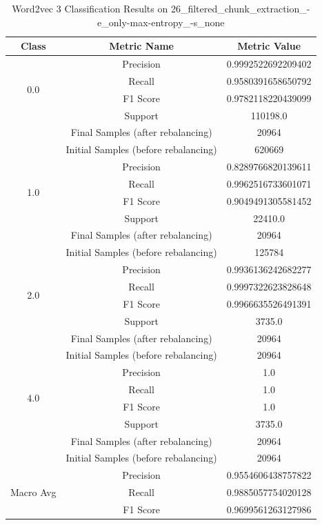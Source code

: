 \begin{longtable}{|c|c|c|}
\caption{Word2vec 3 Classification Results on 26\_filtered\_chunk\_extraction\_-e\_only-max-entropy\_-s\_none} \label{tab:26_filtered_chunk_extraction_-e_only-max-entropy_-s_none_word2vec_3_classifiers_results} \\
\hline
Class & Metric Name & Metric Value \\
\hline
\multirow{4}{*}{0.0} & Precision & 0.9992522692209402 \\
 & Recall & 0.9580391658650792 \\
 & F1 Score & 0.9782118220439099 \\
 & Support & 110198.0 \\
 & Final Samples (after rebalancing) & 20964 \\
 & Initial Samples (before rebalancing) & 620669 \\
\hline
\multirow{4}{*}{1.0} & Precision & 0.8289766820139611 \\
 & Recall & 0.9962516733601071 \\
 & F1 Score & 0.9049491305581452 \\
 & Support & 22410.0 \\
 & Final Samples (after rebalancing) & 20964 \\
 & Initial Samples (before rebalancing) & 125784 \\
\hline
\multirow{4}{*}{2.0} & Precision & 0.9936136242682277 \\
 & Recall & 0.9997322623828648 \\
 & F1 Score & 0.9966635526491391 \\
 & Support & 3735.0 \\
 & Final Samples (after rebalancing) & 20964 \\
 & Initial Samples (before rebalancing) & 20964 \\
\hline
\multirow{4}{*}{4.0} & Precision & 1.0 \\
 & Recall & 1.0 \\
 & F1 Score & 1.0 \\
 & Support & 3735.0 \\
 & Final Samples (after rebalancing) & 20964 \\
 & Initial Samples (before rebalancing) & 20964 \\
\hline
\multirow{4}{*}{Macro Avg} & Precision & 0.9554606438757822 \\
 & Recall & 0.9885057754020128 \\
 & F1 Score & 0.9699561263127986 \\

\end{longtable}
